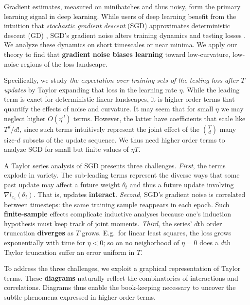   Gradient estimates, measured on minibatches and thus noisy, form the primary
learning signal in deep learning.  While users of deep learning
benefit from the intuition that \emph{stochastic gradient descent} (SGD)
approximates deterministic descent (GD) \citep{bo91,le15}, SGD's gradient noise
alters training dynamics and testing losses \citep{go18,wu20}.  We
analyze these dynamics on short timescales or near minima.  We apply
our theory to find that \textbf{gradient noise biases
learning} toward low-curvature, low-noise regions of the loss landscape.

  Specifically, we study \emph{the expectation over training sets of the
testing loss after $T$ updates} by Taylor expanding that loss in the learning
rate $\eta$.  While the leading term is exact for deterministic linear
landscapes, it is higher order terms that quantify the effects of noise and
curvature.
%
It may seem that for small $\eta$ we may neglect higher $O(\eta^d)$ terms.
However, the latter have coefficients that scale like $T^d/d!$, since such
terms intuitively represent the joint effect of the ${T\choose d}$ many
size-$d$ subsets of the %
update sequence.   We thus need higher order
terms to analyze SGD for small but finite values of $\eta T$.  


  A Taylor series analysis of SGD presents three challenges.
%
\emph{First}, the terms explode in variety.  The sub-leading terms
represent the diverse ways that some past update may affect a future
weight $\theta_t$ and thus a future update involving $\nabla
l_{x_t}(\theta_t)$.  That is, updates \textbf{interact}.
%
\emph{Second}, SGD's gradient noise is correlated between timesteps: the same
training sample reappears in each epoch.  Such \textbf{finite-sample} effects
complicate inductive analyses because one's induction hypothesis must keep
track of joint moments.%
%
\emph{Third}, the series' $d$th order truncation \textbf{diverges} as $T$
grows.  E.g.\ for linear least squares, the loss
grows exponentially with time for $\eta<0$; so on no neighorhood of $\eta=0$
does a $d$th Taylor truncation suffer an error uniform in $T$. 

  To address the three challenges, we exploit a graphical representation of
Taylor terms.  These \textbf{diagrams} naturally reflect the combinatorics of
interactions and correlations.
Diagrams thus enable the book-keeping necessary to uncover the subtle
phenomena expressed in higher order terms. 

